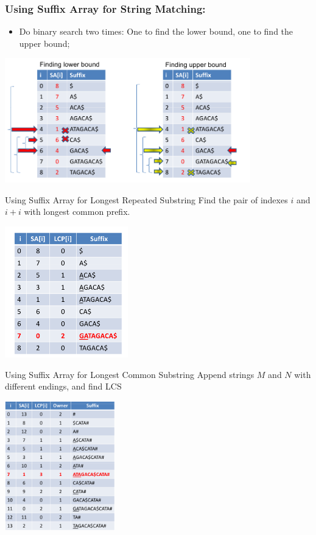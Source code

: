 \begin{frame}
  \frametitle{Using Suffix Array for String Matching:}
  {\smaller
    \begin{block}{}
      \begin{itemize}
      \item Do binary search two times: One to find the lower bound, one to find the upper bound;
      \end{itemize}
    \end{block}
    \begin{center}
      \includegraphics[width=0.8\textwidth]{../img/suffixarray_halim}
    \end{center}
  }
\end{frame}

\begin{frame}{Using Suffix Array for Longest Repeated Substring}
  {Find the pair of indexes $i$ and $i+i$ with longest common prefix.}

    \begin{center}
      \includegraphics[width=0.4\textwidth]{../img/suffixarray2_halim}
    \end{center}
\end{frame}

\begin{frame}{Using Suffix Array for Longest Common Substring}
  {Append strings $M$ and $N$ with different endings, and find LCS}
    \begin{center}
      \includegraphics[width=0.36\textwidth]{../img/suffixarray3_halim}
    \end{center}
\end{frame}
